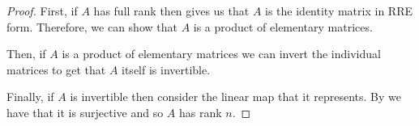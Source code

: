 \documentclass[../Main.tex]{subfiles}
\begin{document}
\begin{proof}
    First, if $A$ has full rank then  gives us that $A$ is the identity matrix in RRE form. Therefore, we can show that $A$ is a product of elementary matrices.

    Then, if $A$ is a product of elementary matrices we can invert the individual matrices to get that $A$ itself is invertible.

    Finally, if $A$ is invertible then consider the linear map that it represents. By  we have that it is surjective and so $A$ has rank $n$.
\end{proof}
\end{document}

